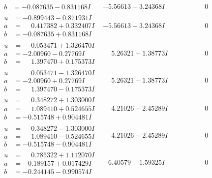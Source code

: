 \documentclass[1p]{elsarticle_modified}
\theoremstyle{definition}
\begin{document}
$$\begin{array}{c|c|c}
\begin{aligned}
b &= -0.087635 - 0.831168 I\end{aligned}
 & -5.56613 + 3.24368 I & \phantom{-0.000000 } 0 \\ \hline\begin{aligned}
u &= -0.899443 - 0.871931 I \\
a &= \phantom{-}0.417382 + 0.332407 I \\
b &= -0.087635 + 0.831168 I\end{aligned}
 & -5.56613 - 3.24368 I & \phantom{-0.000000 } 0 \\ \hline\begin{aligned}
u &= \phantom{-}0.053471 + 1.326470 I \\
a &= -2.00960 - 0.27769 I \\
b &= \phantom{-}1.397470 + 0.175373 I\end{aligned}
 & \phantom{-}5.26321 + 1.38773 I & \phantom{-0.000000 } 0 \\ \hline\begin{aligned}
u &= \phantom{-}0.053471 - 1.326470 I \\
a &= -2.00960 + 0.27769 I \\
b &= \phantom{-}1.397470 - 0.175373 I\end{aligned}
 & \phantom{-}5.26321 - 1.38773 I & \phantom{-0.000000 } 0 \\ \hline\begin{aligned}
u &= \phantom{-}0.348272 + 1.303000 I \\
a &= \phantom{-}1.089410 + 0.524655 I \\
b &= -0.515748 + 0.904481 I\end{aligned}
 & \phantom{-}4.21026 - 2.45289 I & \phantom{-0.000000 } 0 \\ \hline\begin{aligned}
u &= \phantom{-}0.348272 - 1.303000 I \\
a &= \phantom{-}1.089410 - 0.524655 I \\
b &= -0.515748 - 0.904481 I\end{aligned}
 & \phantom{-}4.21026 + 2.45289 I & \phantom{-0.000000 } 0 \\ \hline\begin{aligned}
u &= \phantom{-}0.785322 + 1.112070 I \\
a &= -0.189157 + 0.017429 I \\
b &= -0.244145 - 0.990574 I\end{aligned}
 & -6.40579 - 1.59325 I & \phantom{-0.000000 } 0 \\ \hline\begin{aligned}

\end{aligned}
\end{array}$$
\end{document}
